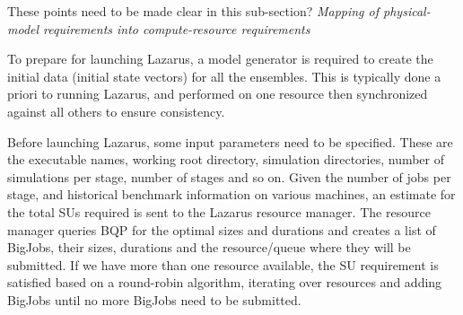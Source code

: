 \documentclass[conference,final]{IEEEtran}
\begin{document}

These points need to be made clear in this sub-section? \newline
 {\it Mapping of physical-model
  requirements into compute-resource requirements} \newline


To prepare for launching Lazarus, a model generator is required to create
the initial data (initial state vectors) for all the ensembles. This is typically
done a priori to running Lazarus, and performed on one resource then synchronized
against all others to ensure consistency.

Before launching Lazarus, some input parameters need to be specified.
These are the executable names, working root directory, simulation directories,
number of simulations per stage, number of stages and so on. Given 
the number of jobs per stage, and historical benchmark information on various
machines, an estimate for the total SUs required is sent to the Lazarus
resource manager. The resource manager queries BQP for the optimal sizes and durations
and creates a list of BigJobs, their sizes, durations and the resource/queue
where they will be submitted. If we have more than one resource available, the SU
requirement is satisfied based on a round-robin algorithm, iterating over
resources and adding BigJobs until no more BigJobs need to be submitted.
\end{document}
